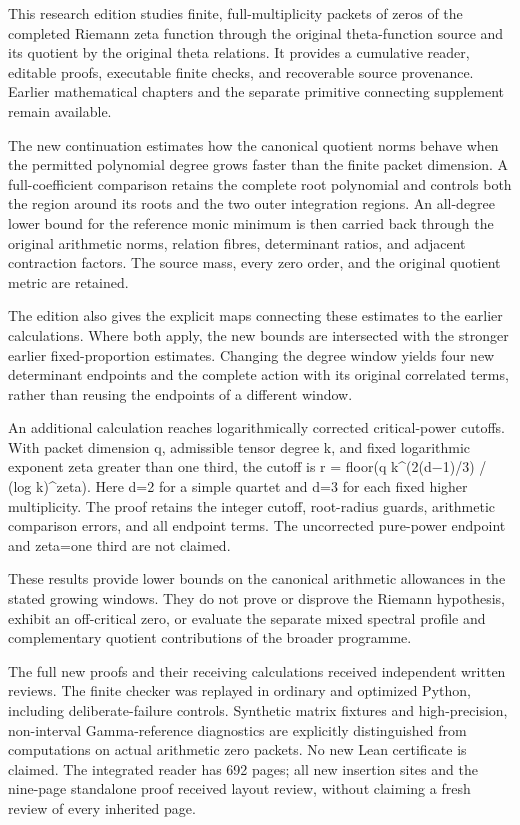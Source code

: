 \documentclass[
]{article}
\begin{document}
This research edition studies finite, full-multiplicity packets of zeros
of the completed Riemann zeta function through the original
theta-function source and its quotient by the original theta relations.
It provides a cumulative reader, editable proofs, executable finite
checks, and recoverable source provenance. Earlier mathematical chapters
and the separate primitive connecting supplement remain available.

The new continuation estimates how the canonical quotient norms behave
when the permitted polynomial degree grows faster than the finite packet
dimension. A full-coefficient comparison retains the complete root
polynomial and controls both the region around its roots and the two
outer integration regions. An all-degree lower bound for the reference
monic minimum is then carried back through the original arithmetic
norms, relation fibres, determinant ratios, and adjacent contraction
factors. The source mass, every zero order, and the original quotient
metric are retained.

The edition also gives the explicit maps connecting these estimates to
the earlier calculations. Where both apply, the new bounds are
intersected with the stronger earlier fixed-proportion estimates.
Changing the degree window yields four new determinant endpoints and the
complete action with its original correlated terms, rather than reusing
the endpoints of a different window.

An additional calculation reaches logarithmically corrected
critical-power cutoffs. With packet dimension q, admissible tensor
degree k, and fixed logarithmic exponent zeta greater than one third,
the cutoff is r = floor(q k\^{}(2(d−1)/3) / (log k)\^{}zeta). Here d=2
for a simple quartet and d=3 for each fixed higher multiplicity. The
proof retains the integer cutoff, root-radius guards, arithmetic
comparison errors, and all endpoint terms. The uncorrected pure-power
endpoint and zeta=one third are not claimed.

These results provide lower bounds on the canonical arithmetic
allowances in the stated growing windows. They do not prove or disprove
the Riemann hypothesis, exhibit an off-critical zero, or evaluate the
separate mixed spectral profile and complementary quotient contributions
of the broader programme.

The full new proofs and their receiving calculations received
independent written reviews. The finite checker was replayed in ordinary
and optimized Python, including deliberate-failure controls. Synthetic
matrix fixtures and high-precision, non-interval Gamma-reference
diagnostics are explicitly distinguished from computations on actual
arithmetic zero packets. No new Lean certificate is claimed. The
integrated reader has 692 pages; all new insertion sites and the
nine-page standalone proof received layout review, without claiming a
fresh review of every inherited page.
\end{document}
